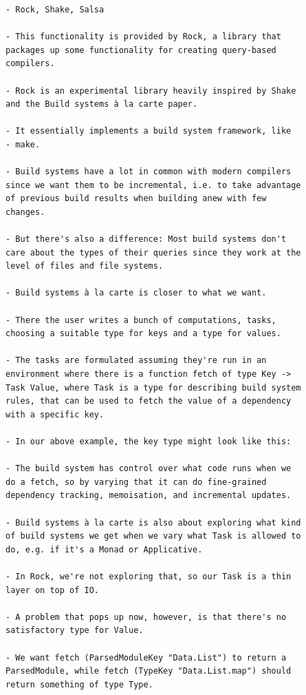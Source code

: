 \documentclass[12pt, a4paper]{report}
\begin{document}
\begin{verbatim}
- Rock, Shake, Salsa

- This functionality is provided by Rock, a library that
packages up some functionality for creating query-based
compilers.

- Rock is an experimental library heavily inspired by Shake
and the Build systems à la carte paper.

- It essentially implements a build system framework, like
- make.

- Build systems have a lot in common with modern compilers
since we want them to be incremental, i.e. to take advantage
of previous build results when building anew with few
changes.

- But there's also a difference: Most build systems don't
care about the types of their queries since they work at the
level of files and file systems.

- Build systems à la carte is closer to what we want.

- There the user writes a bunch of computations, tasks,
choosing a suitable type for keys and a type for values.

- The tasks are formulated assuming they're run in an
environment where there is a function fetch of type Key ->
Task Value, where Task is a type for describing build system
rules, that can be used to fetch the value of a dependency
with a specific key.

- In our above example, the key type might look like this:

- The build system has control over what code runs when we
do a fetch, so by varying that it can do fine-grained
dependency tracking, memoisation, and incremental updates.

- Build systems à la carte is also about exploring what kind
of build systems we get when we vary what Task is allowed to
do, e.g. if it's a Monad or Applicative.

- In Rock, we're not exploring that, so our Task is a thin
layer on top of IO.

- A problem that pops up now, however, is that there's no
satisfactory type for Value.

- We want fetch (ParsedModuleKey "Data.List") to return a
ParsedModule, while fetch (TypeKey "Data.List.map") should
return something of type Type.
\end{verbatim}
\cite{olle_query_based}

\end{document}
